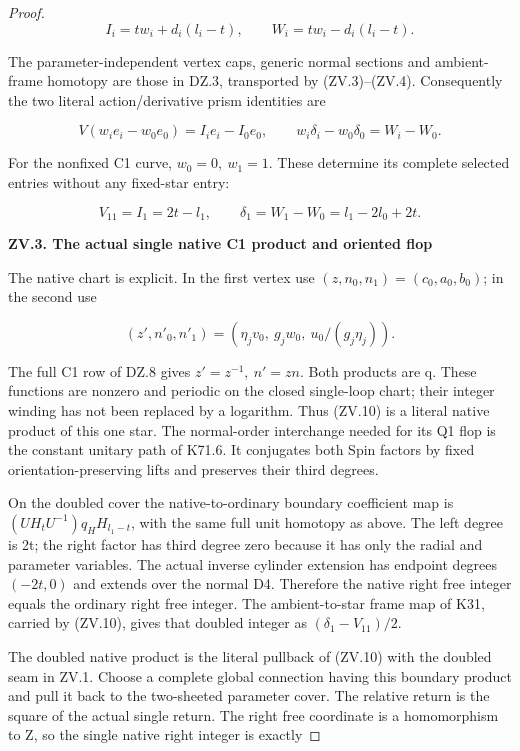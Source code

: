 \begin{proof}
\[
 I_i=t w_i+d_i(l_i-t),\qquad
 W_i=t w_i-d_i(l_i-t).                              \tag{ZV.7}
\]

The parameter-independent vertex caps, generic normal sections and
ambient-frame homotopy are those in DZ.3, transported by (ZV.3)--(ZV.4).
Consequently the two literal action/derivative prism identities are

\[
 V(w_i e_i-w_0e_0)=I_i e_i-I_0e_0,\qquad
 w_i\delta_i-w_0\delta_0=W_i-W_0.                  \tag{ZV.8}
\]

For the nonfixed C1 curve, \(w_0=0,\ w_1=1\). These determine its complete
selected entries without any fixed-star entry:

\[
 V_{11}=I_1=2t-l_1,\qquad
 \delta_1=W_1-W_0=l_1-2l_0+2t.                     \tag{ZV.9}
\]

\par

\medskip\noindent\textbf{ZV.3. The actual single native C1 product and oriented flop}

\par\nopagebreak[4]

The native chart is explicit. In the first vertex use
\((z,n_0,n_1)=(c_0,a_0,b_0)\); in the second use

\[
 (z',n'_0,n'_1)=(\eta_jv_0,\ g_jw_0,\ u_0/(g_j\eta_j)).
                                                        \tag{ZV.10}
\]

The full C1 row of DZ.8 gives \(z'=z^{-1},\ n'=zn\). Both products
are q. These functions are nonzero and periodic on the closed
single-loop chart; their integer winding has not been replaced by a
logarithm. Thus (ZV.10) is a literal native product of this one star.
The normal-order interchange needed for its Q1 flop is the constant
unitary path of K71.6. It conjugates both Spin factors by fixed
orientation-preserving lifts and preserves their third degrees.

On the doubled cover the native-to-ordinary boundary coefficient map
is \((UH_tU^{-1})q_HH_{l_1-t}\), with the same full unit homotopy as above.
The left degree is 2t; the right factor has third degree zero because
it has only the radial and parameter variables. The actual inverse
cylinder extension has endpoint degrees \((-2t,0)\) and extends over the
normal D4. Therefore the native right free integer equals the ordinary
right free integer. The ambient-to-star frame map of K31, carried by
(ZV.10), gives that doubled integer as \((\delta_1-V_{11})/2\).

The doubled native product is the literal pullback of (ZV.10) with
the doubled seam in ZV.1. Choose a complete global connection having
this boundary product and pull it back to the two-sheeted parameter
cover. The relative return is the square of the actual single return.
The right free coordinate is a homomorphism to Z, so the single
native right integer is exactly


\end{proof}
